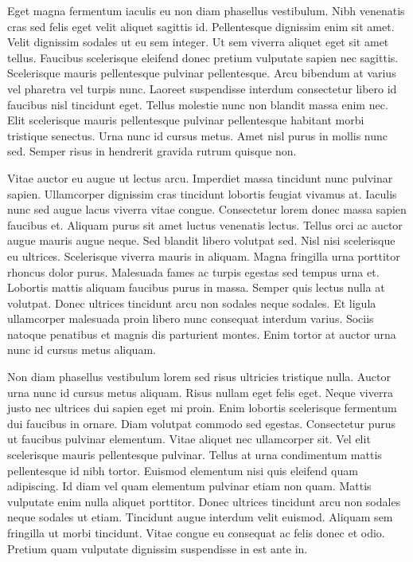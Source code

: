 \documentclass{beamer}
\begin{document}
Eget magna fermentum iaculis eu non diam phasellus vestibulum. Nibh venenatis cras sed felis eget velit aliquet sagittis id. Pellentesque dignissim enim sit amet. Velit dignissim sodales ut eu sem integer. Ut sem viverra aliquet eget sit amet tellus. Faucibus scelerisque eleifend donec pretium vulputate sapien nec sagittis. Scelerisque mauris pellentesque pulvinar pellentesque. Arcu bibendum at varius vel pharetra vel turpis nunc. Laoreet suspendisse interdum consectetur libero id faucibus nisl tincidunt eget. Tellus molestie nunc non blandit massa enim nec. Elit scelerisque mauris pellentesque pulvinar pellentesque habitant morbi tristique senectus. Urna nunc id cursus metus. Amet nisl purus in mollis nunc sed. Semper risus in hendrerit gravida rutrum quisque non.

Vitae auctor eu augue ut lectus arcu. Imperdiet massa tincidunt nunc pulvinar sapien. Ullamcorper dignissim cras tincidunt lobortis feugiat vivamus at. Iaculis nunc sed augue lacus viverra vitae congue. Consectetur lorem donec massa sapien faucibus et. Aliquam purus sit amet luctus venenatis lectus. Tellus orci ac auctor augue mauris augue neque. Sed blandit libero volutpat sed. Nisl nisi scelerisque eu ultrices. Scelerisque viverra mauris in aliquam. Magna fringilla urna porttitor rhoncus dolor purus. Malesuada fames ac turpis egestas sed tempus urna et. Lobortis mattis aliquam faucibus purus in massa. Semper quis lectus nulla at volutpat. Donec ultrices tincidunt arcu non sodales neque sodales. Et ligula ullamcorper malesuada proin libero nunc consequat interdum varius. Sociis natoque penatibus et magnis dis parturient montes. Enim tortor at auctor urna nunc id cursus metus aliquam.

Non diam phasellus vestibulum lorem sed risus ultricies tristique nulla. Auctor urna nunc id cursus metus aliquam. Risus nullam eget felis eget. Neque viverra justo nec ultrices dui sapien eget mi proin. Enim lobortis scelerisque fermentum dui faucibus in ornare. Diam volutpat commodo sed egestas. Consectetur purus ut faucibus pulvinar elementum. Vitae aliquet nec ullamcorper sit. Vel elit scelerisque mauris pellentesque pulvinar. Tellus at urna condimentum mattis pellentesque id nibh tortor. Euismod elementum nisi quis eleifend quam adipiscing. Id diam vel quam elementum pulvinar etiam non quam. Mattis vulputate enim nulla aliquet porttitor. Donec ultrices tincidunt arcu non sodales neque sodales ut etiam. Tincidunt augue interdum velit euismod. Aliquam sem fringilla ut morbi tincidunt. Vitae congue eu consequat ac felis donec et odio. Pretium quam vulputate dignissim suspendisse in est ante in.
\end{document}
